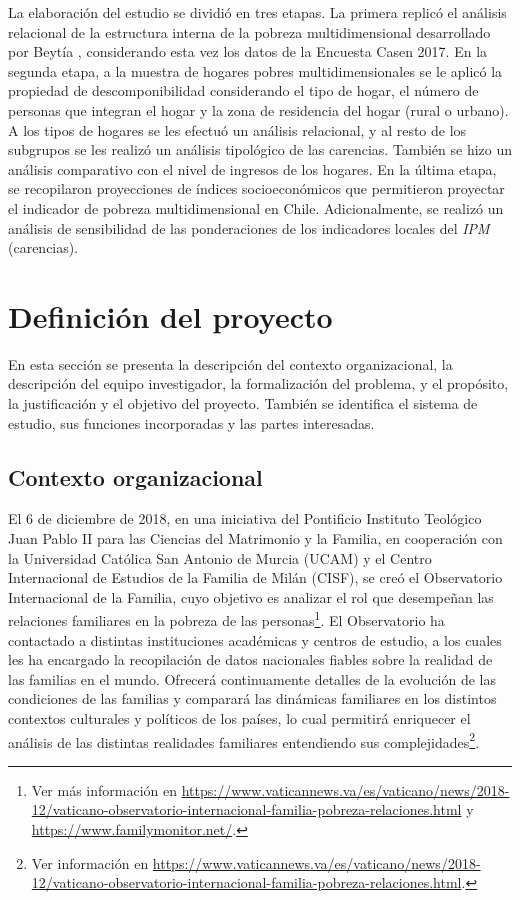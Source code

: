 \documentclass[12pt,letterpaper,spanish]{article}
\begin{document}
La elaboración del estudio se dividió en tres etapas. La primera replicó el análisis relacional de la estructura interna de la pobreza multidimensional desarrollado por Beytía \cite{Beytia2016LaMultidimensional}, considerando esta vez los datos de la Encuesta Casen 2017. En la segunda etapa, a la muestra de hogares pobres multidimensionales se le aplicó la propiedad de descomponibilidad considerando el tipo de hogar, el número de personas que integran el hogar y la zona de residencia del hogar (rural o urbano). A los tipos de hogares se les efectuó un análisis relacional, y al resto de los subgrupos se les realizó un análisis tipológico de las carencias. También se hizo un análisis comparativo con el nivel de ingresos de los hogares. En la última etapa, se recopilaron proyecciones de índices socioeconómicos que permitieron proyectar el indicador de pobreza multidimensional en Chile. Adicionalmente, se realizó un análisis de sensibilidad de las ponderaciones de los indicadores locales del \textit{IPM} (carencias).





 


\newpage
\section{Definición del proyecto} %
En esta sección se presenta la descripción del contexto organizacional, la descripción del equipo investigador, la formalización del problema, y el propósito, la justificación y el objetivo del proyecto. También se identifica el sistema de estudio, sus funciones incorporadas y las partes interesadas.

\subsection{Contexto organizacional}
El 6 de diciembre de 2018, en una iniciativa del Pontificio Instituto Teológico Juan Pablo II para las Ciencias del Matrimonio y la Familia, en cooperación con la Universidad Católica San Antonio de Murcia (UCAM) y el Centro Internacional de Estudios de la Familia de Milán (CISF), se creó el Observatorio Internacional de la Familia, cuyo objetivo es analizar el rol que desempeñan las relaciones familiares en la pobreza de las personas\footnote{Ver más información en \url{https://www.vaticannews.va/es/vaticano/news/2018-12/vaticano-observatorio-internacional-familia-pobreza-relaciones.html} y \url{https://www.familymonitor.net/}.}. El Observatorio ha contactado a distintas instituciones académicas y centros de estudio, a los cuales les ha encargado la recopilación de datos nacionales fiables sobre la realidad de las familias en el mundo. Ofrecerá continuamente detalles de la evolución de las condiciones de las familias y comparará las dinámicas familiares en los distintos contextos culturales y políticos de los países, lo cual permitirá enriquecer el análisis de las distintas realidades familiares entendiendo sus complejidades\footnote{Ver información en \url{https://www.vaticannews.va/es/vaticano/news/2018-12/vaticano-observatorio-internacional-familia-pobreza-relaciones.html}.}. 
\end{document}

